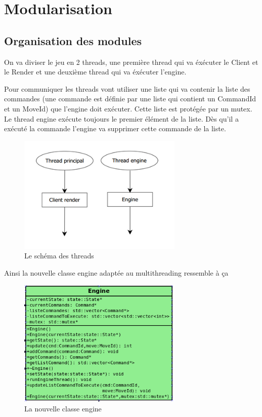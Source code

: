 \documentclass[a4paper,12pt]{article}
\begin{document}
\section{Modularisation}
\label{sec:module}
\subsection{Organisation des modules}
On va diviser le jeu en 2 threads, une première thread qui va éxécuter le Client et le Render et une deuxième thread qui va éxécuter l'engine.

Pour communiquer les threads vont utiliser une liste qui va contenir la liste des commandes (une commande est définie par une liste qui contient un CommandId et un MoveId) que l'engine doit exécuter. Cette liste est protégée par un mutex. Le thread engine exécute toujours le premier élément de la liste. Dès qu'il a exécuté la commande l'engine va supprimer cette commande de la liste.
\begin{figure}[ht]
\begin{center}
\includegraphics[width=0.7\textwidth]{thread.png}
\caption{\label{pacmangame}Le schéma des threads}
\end{center}
\end{figure}
\newpage
Ainsi la nouvelle classe engine adaptée au multithreading ressemble à ça

\begin{figure}[ht]
\begin{center}
\includegraphics[width=0.7\textwidth]{enginethread.png}
\caption{La nouvelle classe engine}
\end{center}
\end{figure}
\end{document}
